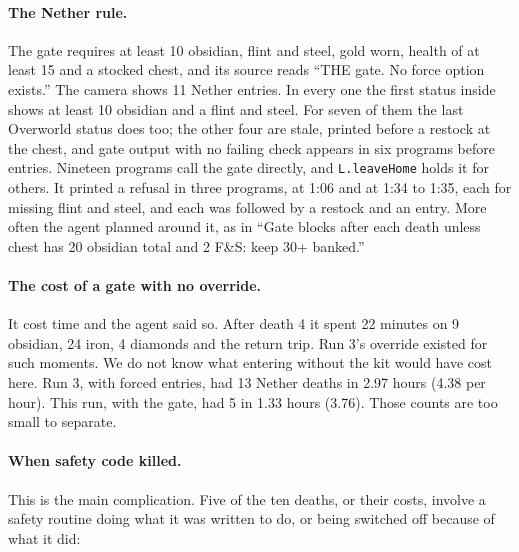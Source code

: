 \documentclass[11pt,a4paper]{article}
\begin{document}
\paragraph{The Nether rule.} The gate requires at least 10 obsidian, flint and steel, gold worn, health of at least 15 and a stocked chest, and its source reads ``THE gate. No force option exists.'' The camera shows 11 Nether entries. In every one the first status inside shows at least 10 obsidian and a flint and steel. For seven of them the last Overworld status does too; the other four are stale, printed before a restock at the chest, and gate output with no failing check appears in six programs before entries. Nineteen programs call the gate directly, and \texttt{L.leaveHome} holds it for others. It printed a refusal in three programs, at 1:06 and at 1:34 to 1:35, each for missing flint and steel, and each was followed by a restock and an entry. More often the agent planned around it, as in ``Gate blocks after each death unless chest has 20 obsidian total and 2 F\&S: keep 30+ banked.''

\paragraph{The cost of a gate with no override.} It cost time and the agent said so. After death 4 it spent 22 minutes on 9 obsidian, 24 iron, 4 diamonds and the return trip. Run 3's override existed for such moments. We do not know what entering without the kit would have cost here. Run 3, with forced entries, had 13 Nether deaths in 2.97 hours (4.38 per hour). This run, with the gate, had 5 in 1.33 hours (3.76). Those counts are too small to separate.

\paragraph{When safety code killed.} This is the main complication. Five of the ten deaths, or their costs, involve a safety routine doing what it was written to do, or being switched off because of what it did:
\end{document}
